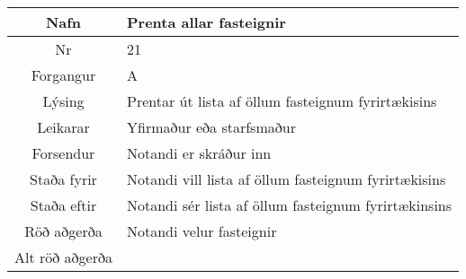 \documentclass[a4paper]{article}
\begin{document}
\begin{tabular}{|c|p{10cm}|}
\hline
Nafn&Prenta allar fasteignir\\
\hline
Nr&21\\
\hline
Forgangur&A\\
\hline
Lýsing&Prentar út lista af öllum fasteignum fyrirtækisins\\
\hline
Leikarar&Yfirmaður eða starfsmaður\\
\hline
Forsendur&Notandi er skráður inn\\
\hline
Staða fyrir&Notandi vill lista af öllum fasteignum fyrirtækisins\\
\hline
Staða eftir&Notandi sér lista af öllum fasteignum fyrirtækinsins\\
\hline
Röð aðgerða&Notandi velur fasteignir\\
\hline
Alt röð aðgerða&\\
\hline
\end{tabular}
\end{document}

